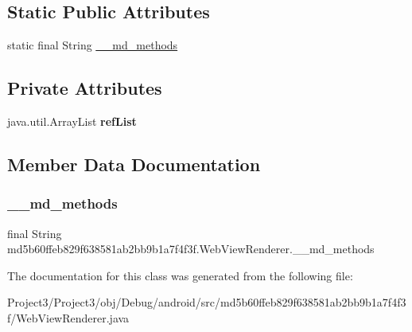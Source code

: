 \subsection*{Static Public Attributes}
\begin{DoxyCompactItemize}
\item 
static final String \hyperlink{classmd5b60ffeb829f638581ab2bb9b1a7f4f3f_1_1WebViewRenderer_a023fa86f93ecfb325971c3a7204ebc7e}{\+\_\+\+\_\+md\+\_\+methods}
\end{DoxyCompactItemize}
\subsection*{Private Attributes}
\begin{DoxyCompactItemize}
\item 
\mbox{\label{classmd5b60ffeb829f638581ab2bb9b1a7f4f3f_1_1WebViewRenderer_a729d3e7508c2fcb66b26f19a378f0efe}} 
java.\+util.\+Array\+List {\bfseries ref\+List}
\end{DoxyCompactItemize}


\subsection{Member Data Documentation}
\mbox{\label{classmd5b60ffeb829f638581ab2bb9b1a7f4f3f_1_1WebViewRenderer_a023fa86f93ecfb325971c3a7204ebc7e}} 
\subsubsection{\texorpdfstring{\+\_\+\+\_\+md\+\_\+methods}{\_\_md\_methods}}
{\footnotesize\ttfamily final String md5b60ffeb829f638581ab2bb9b1a7f4f3f.\+Web\+View\+Renderer.\+\_\+\+\_\+md\+\_\+methods\hspace{0.3cm}{\ttfamily [static]}}



The documentation for this class was generated from the following file\+:\begin{DoxyCompactItemize}
\item 
Project3/\+Project3/obj/\+Debug/android/src/md5b60ffeb829f638581ab2bb9b1a7f4f3f/Web\+View\+Renderer.\+java\end{DoxyCompactItemize}
